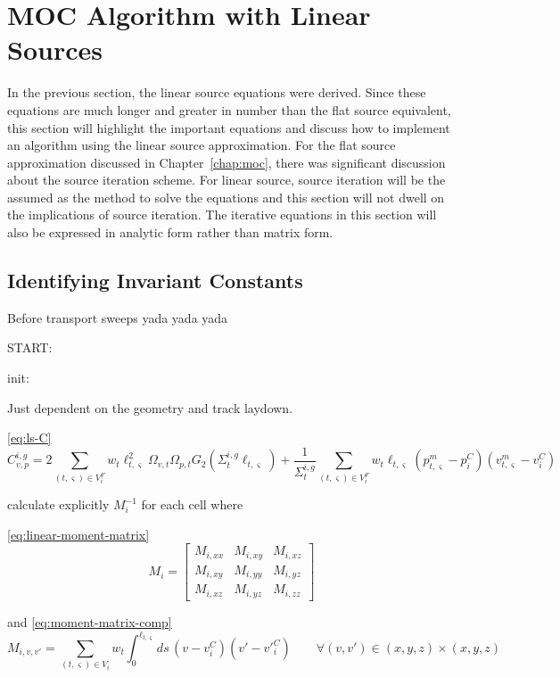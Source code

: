 \section{MOC Algorithm with Linear Sources}
\label{sec:ls-algorithm}

In the previous section, the linear source equations were derived. Since these equations are much longer and greater in number than the flat source equivalent, this section will highlight the important equations and discuss how to implement an algorithm using the linear source approximation. For the flat source approximation discussed in Chapter~\ref{chap:moc}, there was significant discussion about the source iteration scheme. For linear source, source iteration will be the assumed as the method to solve the equations and this section will not dwell on the implications of source iteration. The iterative equations in this section will also be expressed in analytic form rather than matrix form.

\subsection{Identifying Invariant Constants}

Before transport sweeps yada yada yada

START:

init:

Just dependent on the geometry and track laydown.

\ref{eq:ls-C}
\begin{equation*}
C_{v,p}^{i,g} =  2 \sum_{(t,\varsigma) \in V^F_i} w_t \ell_{t,\varsigma}^2 \Omega_{v,t} \Omega_{p,t} G_2(\Sigma_{t}^{i,g} \ell_{t,\varsigma}) + \frac{1}{\Sigma_{t}^{i,g}} \sum_{(t,\varsigma) \in V^F_i} w_t \ell_{t,\varsigma} \left( p^m_{t,\varsigma} - p^C_i \right) \left(v^m_{t,\varsigma} - v^C_i\right)
\end{equation*}

calculate explicitly $M_i^{-1}$ for each cell where

\ref{eq:linear-moment-matrix}
\begin{equation*}
M_i = 
\begin{bmatrix}
M_{i,xx} & M_{i,xy}  & M_{i,xz} \\
M_{i,xy} & M_{i,yy}  & M_{i,yz} \\
M_{i,xz} & M_{i,yz}  & M_{i,zz}
\end{bmatrix}
\end{equation*}

and
\ref{eq:moment-matrix-comp}
\begin{equation*}
M_{i,v,v'} = \sum_{(t,\varsigma) \in V_i} w_t  \int_{0}^{\ell_{t,\varsigma}} ds \, \left(v - v^C_i\right) \left( v' - {v'}^C_i \right) \qquad \forall (v,v') \in (x,y,z) \times (x,y,z)
\end{equation*}



